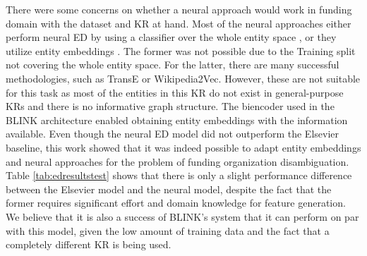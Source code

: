 \documentclass{report}
\theoremstyle{definition}
\theoremstyle{remark}
\begin{document}
\begin{center}
\end{center}

There were some concerns on whether a neural approach would work in funding domain with the dataset and KR at hand. Most of the neural approaches either perform neural ED by using a classifier over the whole entity space \cite{bertEL}, or they utilize entity embeddings \cite{scalablezeroshot,dca,googleintern}. The former was not possible due to the Training split not covering the whole entity space. For the latter, there are many successful methodologies, such as TransE or Wikipedia2Vec. However, these are not suitable for this task as most of the entities in this KR do not exist in general-purpose KRs and there is no informative graph structure. The biencoder used in the BLINK architecture enabled obtaining entity embeddings with the information available. Even though the neural ED model did not outperform the Elsevier baseline, this work showed that it was indeed possible to adapt entity embeddings and neural approaches for the problem of funding organization disambiguation. Table \ref{tab:edresultstest} shows that there is only a slight performance difference between the Elsevier model and the neural model, despite the fact that the former requires significant effort and domain knowledge for feature generation. We believe that it is also a success of BLINK's system that it can perform on par with this model, given the low amount of training data and the fact that a completely different KR is being used.
\end{document}
